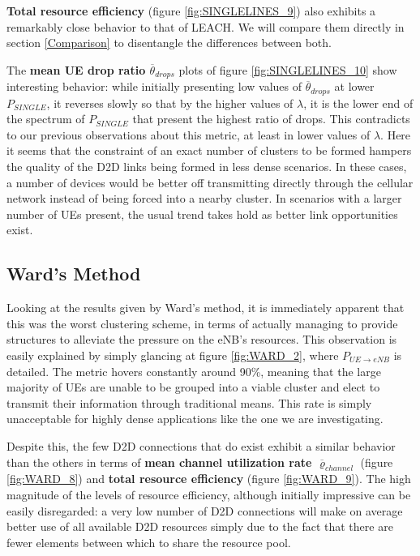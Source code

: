 \textbf{Total resource efficiency} (figure \ref{fig:SINGLELINES_9}) also exhibits a remarkably close behavior to that of LEACH. We will compare them directly in section \ref{Comparison} to disentangle the differences between both.

The \textbf{mean UE drop ratio $\overline{\theta}_{drops}$} plots of figure \ref{fig:SINGLELINES_10} show interesting behavior: while initially presenting low values of $\overline{\theta}_{drops}$ at lower $P_{SINGLE}$, it reverses slowly so that by the higher values of $\lambda$, it is the lower end of the spectrum of $P_{SINGLE}$ that present the highest ratio of drops. This contradicts to our previous observations about this metric, at least in lower values of $\lambda$. Here it seems that the constraint of an exact number of clusters to be formed hampers the quality of the D2D links being formed in less dense scenarios. In these cases, a number of devices would be better off transmitting directly through the cellular network instead of being forced into a nearby cluster. In scenarios with a larger number of UEs present, the usual trend takes hold as better link opportunities exist.

\subsection{Ward's Method} \label{description:WARD}

Looking at the results given by Ward's method, it is immediately apparent that this was the worst clustering scheme, in terms of actually managing to provide structures to alleviate the pressure on the eNB's resources. This observation is easily explained by simply glancing at figure \ref{fig:WARD_2}, where $P_{UE\rightarrow eNB}$ is detailed. The metric hovers constantly around 90\%, meaning that the large majority of UEs are unable to be grouped into a viable cluster and elect to transmit their information through traditional means. This rate is simply unacceptable for highly dense applications like the one we are investigating.

Despite this, the few D2D connections that do exist exhibit a similar behavior than the others in terms of \textbf{mean channel utilization rate $\overline{\varrho}_{channel}$} (figure \ref{fig:WARD_8}) and \textbf{total resource efficiency} (figure \ref{fig:WARD_9}). The high magnitude of the levels of resource efficiency, although initially impressive can be easily disregarded: a very low number of D2D connections will make on average better use of all available D2D resources simply due to the fact that there are fewer elements between which to share the resource pool.

